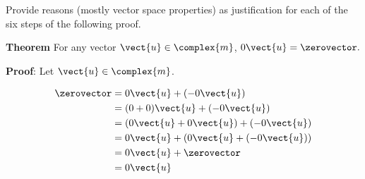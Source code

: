 Provide reasons (mostly vector space properties) as justification for each of the six steps of the following proof.\par
%
{\bf Theorem}
For any vector $\vect{u}\in\complex{m}$, $0\vect{u}=\zerovector.$\par
%
{\bf Proof}: Let $\vect{u}\in\complex{m}$.\par
%
\begin{align*}
\zerovector
&= 0\vect{u} +(-0\vect{u})\\
&= (0+0)\vect{u} + (-0\vect{u})\\
&= (0\vect{u}+0\vect{u}) + (-0\vect{u})\\
&= 0\vect{u} + (0\vect{u} + (-0\vect{u}))\\
&= 0\vect{u} + \zerovector\\
&= 0\vect{u}
\end{align*}
